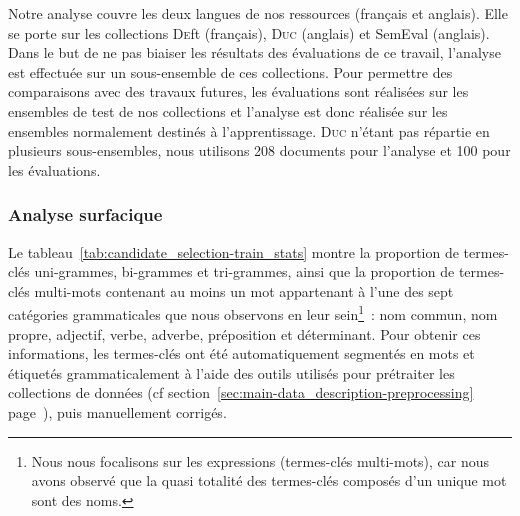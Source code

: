       Notre analyse couvre les deux langues de nos ressources (français et
      anglais). Elle se porte sur les collections \textsc{De}ft (français),
      \textsc{Duc} (anglais) et SemEval (anglais). Dans le but de ne pas biaiser
      les résultats des évaluations de ce travail, l'analyse est effectuée sur
      un sous-ensemble de ces collections. Pour permettre des comparaisons avec
      des travaux futures, les évaluations sont réalisées sur les ensembles de
      test de nos collections et l'analyse est donc réalisée sur les ensembles
      normalement destinés à l'apprentissage. \textsc{Duc} n'étant pas répartie
      en plusieurs sous-ensembles, nous utilisons 208 documents pour l'analyse
      et 100 pour les évaluations.

      \subsubsection{Analyse surfacique}
      \label{subsubsec:main:domain_independent_keyphrase_extraction-keyphrase_candidate_selection-analysis_of_keyphrase_properties-shalow_analysis}
      Le tableau~\ref{tab:candidate_selection-train_stats} montre la
      proportion de termes-clés uni-grammes, bi-grammes et tri-grammes, ainsi
      que la proportion de termes-clés multi-mots contenant au moins un mot
      appartenant à l'une des sept catégories grammaticales que nous observons
      en leur sein\footnote{ Nous nous focalisons sur les expressions
      (termes-clés multi-mots), car nous avons observé que la quasi totalité des
      termes-clés composés d'un unique mot sont des noms. }~: nom commun, nom
      propre, adjectif, verbe, adverbe, préposition et déterminant. Pour obtenir
      ces informations, les termes-clés ont été automatiquement segmentés en
      mots et étiquetés grammaticalement à l'aide des outils utilisés pour
      prétraiter les collections de données (cf
      section~\ref{sec:main-data_description-preprocessing}
      page~\pageref{sec:main-data_description-preprocessing}), puis manuellement
      corrigés.
